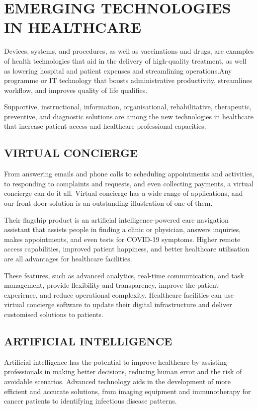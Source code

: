 \documentclass{article}
\begin{document}
\section{EMERGING TECHNOLOGIES IN HEALTHCARE}

Devices, systems, and procedures, as well as vaccinations and drugs, are examples of health technologies that aid in the delivery of high-quality treatment, as well as lowering hospital and patient expenses and streamlining operations.Any programme or IT technology that boosts administrative productivity, streamlines workflow, and improves quality of life qualifies.


Supportive, instructional, information, organisational, rehabilitative, therapeutic, preventive, and diagnostic solutions are among the new technologies in healthcare that increase patient access and healthcare professional capacities.

\subsection{VIRTUAL CONCIERGE}

From answering emails and phone calls to scheduling appointments and activities, to responding to complaints and requests, and even collecting payments, a virtual concierge can do it all. Virtual concierge has a wide range of applications, and our front door solution is an outstanding illustration of one of them.


Their flagship product is an artificial intelligence-powered care navigation assistant that assists people in finding a clinic or physician, answers inquiries, makes appointments, and even tests for COVID-19 symptoms. Higher remote access capabilities, improved patient happiness, and better healthcare utilisation are all advantages for healthcare facilities.


These features, such as advanced analytics, real-time communication, and task management, provide flexibility and transparency, improve the patient experience, and reduce operational complexity. Healthcare facilities can use virtual concierge software to update their digital infrastructure and deliver customised solutions to patients.

\subsection{ARTIFICIAL INTELLIGENCE}

Artificial intelligence has the potential to improve healthcare by assisting professionals in making better decisions, reducing human error and the risk of avoidable scenarios. Advanced technology aids in the development of more efficient and accurate solutions, from imaging equipment and immunotherapy for cancer patients to identifying infectious disease patterns.
\end{document}
